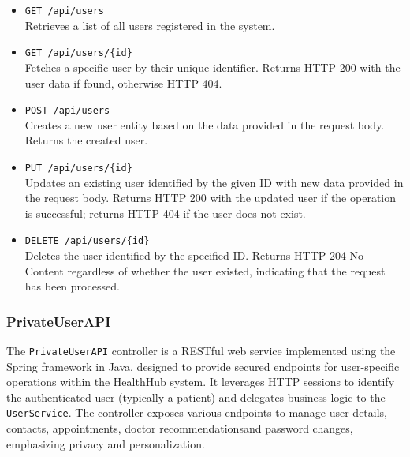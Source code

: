 \begin{itemize}
	\item \texttt{GET /api/users} \\
	Retrieves a list of all users registered in the system.
	
	\item \texttt{GET /api/users/\{id\}} \\
	Fetches a specific user by their unique identifier. Returns HTTP 200 with the user data if found, otherwise HTTP 404.
	
	\item \texttt{POST /api/users} \\
	Creates a new user entity based on the data provided in the request body. Returns the created user.
	
	\item \texttt{PUT /api/users/\{id\}} \\
	Updates an existing user identified by the given ID with new data provided in the request body. Returns HTTP 200 with the updated user if the operation is successful; returns HTTP 404 if the user does not exist.
	
	\item \texttt{DELETE /api/users/\{id\}} \\
	Deletes the user identified by the specified ID. Returns HTTP 204 No Content regardless of whether the user existed, indicating that the request has been processed.
\end{itemize}

\subsubsection{PrivateUserAPI}
The \texttt{PrivateUserAPI} controller is a RESTful web service implemented using the Spring framework in Java, designed to provide secured endpoints for user-specific operations within the HealthHub system. It leverages HTTP sessions to identify the authenticated user (typically a patient) and delegates business logic to the \texttt{UserService}. The controller exposes various endpoints to manage user details, contacts, appointments, doctor recommendationsand password changes, emphasizing privacy and personalization.


